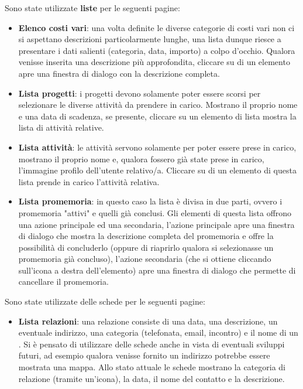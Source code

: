 Sono state utilizzate \textbf{liste} per le seguenti pagine:
\begin{itemize}
\item \textbf{Elenco costi vari}: una volta definite le diverse categorie di costi vari non
ci si aspettano descrizioni particolarmente lunghe, una lista dunque riesce a presentare
i dati salienti (categoria, data, importo) a colpo d'occhio. Qualora venisse inserita
una descrizione più approfondita, cliccare su di un elemento apre una finestra di dialogo
con la descrizione completa.
\item \textbf{Lista progetti}: i progetti devono solamente poter essere scorsi per selezionare
le diverse attività da prendere in carico. Mostrano il proprio nome e una data di scadenza,
se presente, cliccare su un elemento di lista mostra la lista di attività relative.
\item \textbf{Lista attività}: le attività servono solamente per poter essere prese in carico,
mostrano il proprio nome e, qualora fossero già state prese in carico, l'immagine profilo
dell'utente relativo/a. Cliccare su di un elemento di questa lista prende in carico l'attività
relativa.
\item \textbf{Lista promemoria}: in questo caso la lista è divisa in due parti, ovvero i promemoria
"attivi" e quelli già conclusi. Gli elementi di questa lista offrono una azione principale
ed una secondaria, l'azione principale apre una finestra di dialogo che mostra la descrizione
completa del promemoria e offre la possibilità di concluderlo (oppure di riaprirlo qualora
si selezionasse un promemoria già concluso), l'azione secondaria (che si ottiene cliccando
sull'icona a destra dell'elemento) apre una finestra di dialogo che permette di cancellare
il promemoria.
\end{itemize}

Sono state utilizzate delle schede per le seguenti pagine:
\begin{itemize}
\item \textbf{Lista relazioni}: una relazione consiste di una data, una descrizione, un
eventuale indirizzo, una categoria (telefonata, email, incontro) e il nome di un
.
Si è pensato di utilizzare delle schede anche in vista di eventuali sviluppi futuri,
ad esempio qualora venisse fornito un indirizzo potrebbe essere mostrata una mappa.
Allo stato attuale le schede mostrano la categoria di relazione (tramite un'icona),
la data, il nome del contatto e la descrizione.
\end{itemize}

